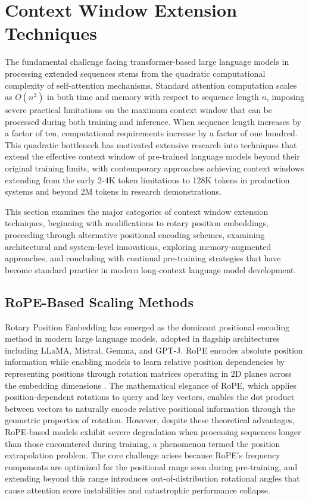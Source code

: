 \section{Context Window Extension Techniques}
\label{sec:extension}

The fundamental challenge facing transformer-based large language models in processing extended sequences stems from the quadratic computational complexity of self-attention mechanisms. Standard attention computation scales as $O(n^2)$ in both time and memory with respect to sequence length $n$, imposing severe practical limitations on the maximum context window that can be processed during both training and inference. When sequence length increases by a factor of ten, computational requirements increase by a factor of one hundred. This quadratic bottleneck has motivated extensive research into techniques that extend the effective context window of pre-trained language models beyond their original training limits, with contemporary approaches achieving context windows extending from the early 2-4K token limitations to 128K tokens in production systems and beyond 2M tokens in research demonstrations.

This section examines the major categories of context window extension techniques, beginning with modifications to rotary position embeddings, proceeding through alternative positional encoding schemes, examining architectural and system-level innovations, exploring memory-augmented approaches, and concluding with continual pre-training strategies that have become standard practice in modern long-context language model development.

\subsection{RoPE-Based Scaling Methods}

Rotary Position Embedding has emerged as the dominant positional encoding method in modern large language models, adopted in flagship architectures including LLaMA, Mistral, Gemma, and GPT-J. RoPE encodes absolute position information while enabling models to learn relative position dependencies by representing positions through rotation matrices operating in 2D planes across the embedding dimensions \citep{su2024roformer}. The mathematical elegance of RoPE, which applies position-dependent rotations to query and key vectors, enables the dot product between vectors to naturally encode relative positional information through the geometric properties of rotation. However, despite these theoretical advantages, RoPE-based models exhibit severe degradation when processing sequences longer than those encountered during training, a phenomenon termed the position extrapolation problem. The core challenge arises because RoPE's frequency components are optimized for the positional range seen during pre-training, and extending beyond this range introduces out-of-distribution rotational angles that cause attention score instabilities and catastrophic performance collapse.

